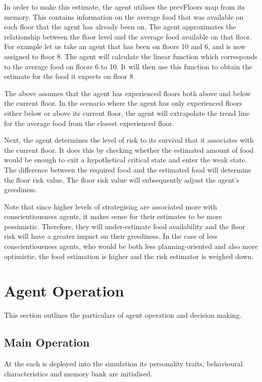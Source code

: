 In order to make this estimate, the agent utilises the prevFloors map from its memory. This contains information on the average food that was available on each floor that the agent has already been on. The agent approximates the relationship between the floor level and the average food available on that floor. For example let us take an agent that has been on floors 10 and 6, and is now assigned to floor 8. The agent will calculate the linear function which corresponds to the average food on floors 6 to 10. It will then use this function to obtain the estimate for the food it expects on floor 8. 

The above assumes that the agent has experienced floors both above and below the current floor. In the scenario where the agent has only experienced floors either below or above its current floor, the agent will extrapolate the trend line for the average food from the closest experienced floor. 

Next, the agent determines the level of risk to its survival that it associates with the current floor. It does this by checking whether the estimated amount of food would be enough to exit a hypothetical critical state and enter the weak state. The difference between the required food and the estimated food will determine the floor risk value. The floor risk value will subsequently adjust the agent's greediness. 

Note that since higher levels of strategising are associated more with conscientiousness agents, it makes sense for their estimates to be more pessimistic. Therefore, they will under-estimate food availability and the floor risk will have a greater impact on their greediness. In the case of less conscientiousness agents, who would be both less planning-oriented and also more optimistic, the food estimation is higher and the risk estimator is weighed down.

\section{Agent Operation}
\label{sec: Agent Operation}
This section outlines the particulars of agent operation and decision making.

\subsection{Main Operation}
\label{subsec: Main Operation}
 
At the each is deployed into the simulation its personality traits, behavioural characteristics and memory bank are initialised. 


